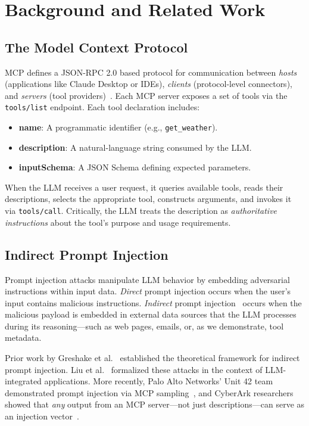 \documentclass[conference]{IEEEtran}
\begin{document}
\section{Background and Related Work}
\label{sec:background}

\subsection{The Model Context Protocol}

MCP defines a JSON-RPC 2.0 based protocol for communication between \textit{hosts} (applications like Claude Desktop or IDEs), \textit{clients} (protocol-level connectors), and \textit{servers} (tool providers)~\cite{errico2025securing}. Each MCP server exposes a set of tools via the \texttt{tools/list} endpoint. Each tool declaration includes:

\begin{itemize}[leftmargin=*]
    \item \textbf{name}: A programmatic identifier (e.g., \texttt{get\_weather}).
    \item \textbf{description}: A natural-language string consumed by the LLM.
    \item \textbf{inputSchema}: A JSON Schema defining expected parameters.
\end{itemize}

When the LLM receives a user request, it queries available tools, reads their descriptions, selects the appropriate tool, constructs arguments, and invokes it via \texttt{tools/call}. Critically, the LLM treats the description as \textit{authoritative instructions} about the tool's purpose and usage requirements.

\subsection{Indirect Prompt Injection}

Prompt injection attacks manipulate LLM behavior by embedding adversarial instructions within input data. \textit{Direct} prompt injection occurs when the user's input contains malicious instructions. \textit{Indirect} prompt injection~\cite{greshake2023not} occurs when the malicious payload is embedded in external data sources that the LLM processes during its reasoning—such as web pages, emails, or, as we demonstrate, tool metadata.

Prior work by Greshake et al.~\cite{greshake2023not} established the theoretical framework for indirect prompt injection. Liu et al.~\cite{liu2024formalizing} formalized these attacks in the context of LLM-integrated applications. More recently, Palo Alto Networks' Unit 42 team demonstrated prompt injection via MCP sampling~\cite{unit42mcp}, and CyberArk researchers showed that \textit{any} output from an MCP server—not just descriptions—can serve as an injection vector~\cite{cyberarkmcp}.
\end{document}

